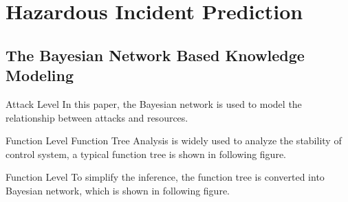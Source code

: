 \section{Hazardous Incident Prediction}
\subsection{The Bayesian Network Based Knowledge Modeling}
\begin{frame}{Attack Level}
    In this paper, the Bayesian network is used to model the relationship between attacks and resources.
    \begin{center}
      
    \end{center}

\end{frame}

\begin{frame}{Function Level}
    Function Tree Analysis is widely used to analyze the stability of control system, a typical function tree is shown in following figure.
    \begin{center}
      
    \end{center}

    \begin{overlayarea}{\textwidth}{1cm}
    \end{overlayarea}
\end{frame}

\begin{frame}{Function Level}
    To simplify the inference, the function tree is converted into Bayesian network, which is shown in following figure.\\
    \begin{overlayarea}{\textwidth}{6cm}
    \begin{center}
    \end{center}
    \end{overlayarea}
\end{frame}

